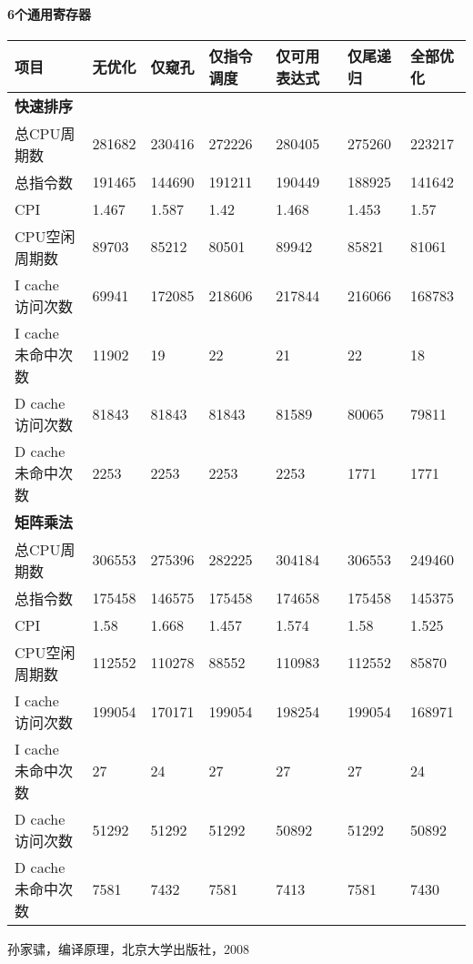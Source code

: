 \paragraph*{6个通用寄存器}
\begin{center}
	\begin{tabular}{lllllll}
\hline
项目 & 无优化 & 仅窥孔 & 仅指令调度 & 仅可用表达式 & 仅尾递归 & 全部优化\\
\hline
\textbf{快速排序} &  &  &  &  &  & \\
总CPU周期数 & 281682 & 230416 & 272226 & 280405 & 275260 & 223217\\
总指令数 & 191465 & 144690 & 191211 & 190449 & 188925 & 141642\\
CPI & 1.467 & 1.587 & 1.42 & 1.468 & 1.453 & 1.57\\
CPU空闲周期数 & 89703 & 85212 & 80501 & 89942 & 85821 & 81061\\
I cache 访问次数  & 69941 & 172085 & 218606 & 217844 & 216066 & 168783\\
I cache 未命中次数 & 11902 & 19 & 22 & 21 & 22 & 18\\
D cache 访问次数 & 81843 & 81843 & 81843 & 81589 & 80065 & 79811\\
D cache 未命中次数 & 2253 & 2253 & 2253 & 2253 & 1771 & 1771\\
\hline
\hline
\textbf{矩阵乘法} &  &  &  &  &  &\\ 
总CPU周期数 & 306553 & 275396 & 282225 & 304184 & 306553 & 249460\\
总指令数 & 175458 & 146575 & 175458 & 174658 & 175458 & 145375\\
CPI & 1.58 & 1.668 & 1.457 & 1.574 & 1.58 & 1.525\\
CPU空闲周期数 & 112552 & 110278 & 88552 & 110983 & 112552 & 85870\\
I cache 访问次数  & 199054 & 170171 & 199054 & 198254 & 199054 & 168971\\
I cache 未命中次数 & 27 & 24 & 27 & 27 & 27 & 24\\
D cache 访问次数 & 51292 & 51292 & 51292 & 50892 & 51292 & 50892\\
D cache 未命中次数 & 7581 & 7432 & 7581 & 7413 & 7581 & 7430\\
\hline
\hline
	\end{tabular}
\end{center}
\begin{thebibliography}{99}
孙家骕，编译原理，北京大学出版社，2008
\end{thebibliography}

